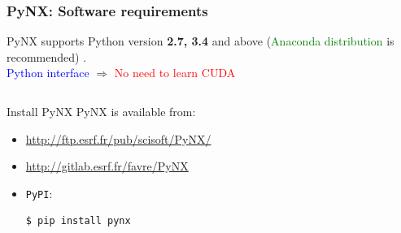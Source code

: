 \documentclass[]{beamer}
\begin{document}
\begin{frame}[fragile]
\frametitle{PyNX: Software requirements}
PyNX supports Python version {\bf 2.7, 3.4} and above (\textcolor{green}{Anaconda distribution} is recommended) .\\ 
\textcolor{blue}{Python interface} $\Rightarrow$ \textcolor{red}{No need to learn CUDA}

\begin{columns}
    \begin{column}{.7\textwidth}
              \hspace*{-1.cm}
                \begin{block}{Install PyNX}
        \small PyNX is available from:
\begin{itemize}
\item<1-> \url{http://ftp.esrf.fr/pub/scisoft/PyNX/}
\item<2-> \url{http://gitlab.esrf.fr/favre/PyNX} 
\item<3-> \texttt{PyPI}: \begin{verbatim}
$ pip install pynx
\end{verbatim}


\end{itemize}
\end{block}
\end{column}
\end{columns}
\end{frame}
\end{document}
